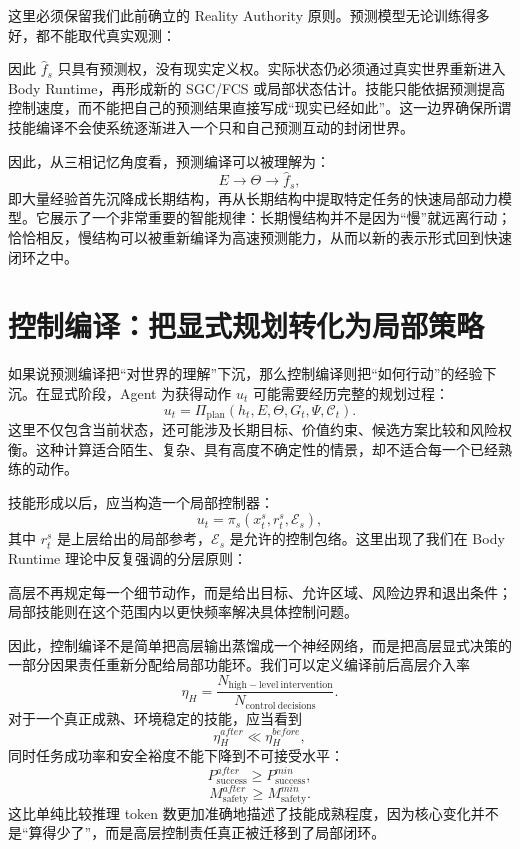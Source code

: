 这里必须保留我们此前确立的 Reality Authority 原则。预测模型无论训练得多好，都不能取代真实观测：
\begin{statementbox}
\centering
{}
\end{statementbox}
因此 $\hat f_s$ 只具有预测权，没有现实定义权。实际状态仍必须通过真实世界重新进入 Body Runtime，再形成新的 SGC/FCS 或局部状态估计。技能只能依据预测提高控制速度，而不能把自己的预测结果直接写成“现实已经如此”。这一边界确保所谓技能编译不会使系统逐渐进入一个只和自己预测互动的封闭世界。

因此，从三相记忆角度看，预测编译可以被理解为：
\[
E
\rightarrow
\Theta
\rightarrow
\hat f_s,
\]
即大量经验首先沉降成长期结构，再从长期结构中提取特定任务的快速局部动力模型。它展示了一个非常重要的智能规律：长期慢结构并不是因为“慢”就远离行动；恰恰相反，慢结构可以被重新编译为高速预测能力，从而以新的表示形式回到快速闭环之中。

\section{控制编译：把显式规划转化为局部策略}

如果说预测编译把“对世界的理解”下沉，那么控制编译则把“如何行动”的经验下沉。在显式阶段，Agent 为获得动作 $u_t$ 可能需要经历完整的规划过程：
\[
u_t
=
\Pi_{\mathrm{plan}}
\left(
h_t,E,\Theta,G_t,\Psi,\mathcal C_t
\right).
\]
这里不仅包含当前状态，还可能涉及长期目标、价值约束、候选方案比较和风险权衡。这种计算适合陌生、复杂、具有高度不确定性的情景，却不适合每一个已经熟练的动作。

技能形成以后，应当构造一个局部控制器：
\[
u_t
=
\pi_s
\left(
x_t^s,
r_t^s,
\mathcal E_s
\right),
\]
其中 $r_t^s$ 是上层给出的局部参考，$\mathcal E_s$ 是允许的控制包络。这里出现了我们在 Body Runtime 理论中反复强调的分层原则：
\begin{statementbox}
\centering
{}
\end{statementbox}
高层不再规定每一个细节动作，而是给出目标、允许区域、风险边界和退出条件；局部技能则在这个范围内以更快频率解决具体控制问题。

因此，控制编译不是简单把高层输出蒸馏成一个神经网络，而是把高层显式决策的一部分因果责任重新分配给局部功能环。我们可以定义编译前后高层介入率
\[
\eta_H
=
\frac{N_{\mathrm{high-level\ intervention}}}
{N_{\mathrm{control\ decisions}}}.
\]
对于一个真正成熟、环境稳定的技能，应当看到
\[
\eta_H^{after}
\ll
\eta_H^{before},
\]
同时任务成功率和安全裕度不能下降到不可接受水平：
\[
P_{\mathrm{success}}^{after}
\ge
P_{\mathrm{success}}^{min},
\]
\[
M_{\mathrm{safety}}^{after}
\ge
M_{\mathrm{safety}}^{min}.
\]
这比单纯比较推理 token 数更加准确地描述了技能成熟程度，因为核心变化并不是“算得少了”，而是高层控制责任真正被迁移到了局部闭环。

